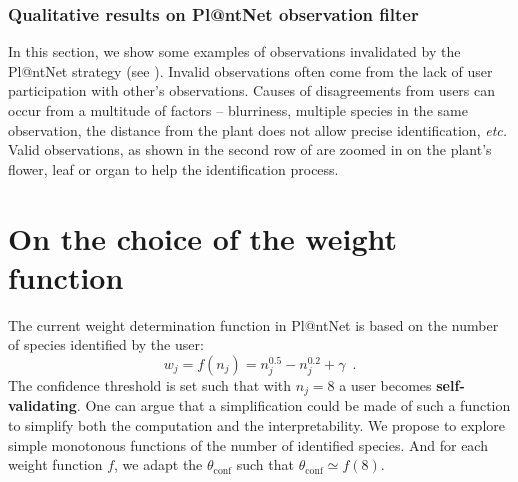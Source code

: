 \subsubsection{Qualitative results on Pl@ntNet observation filter}

In this section, we show some examples of observations invalidated by the Pl@ntNet strategy (see ).
Invalid observations often come from the lack of user participation with other's observations.
Causes of disagreements from users can occur from a multitude of factors -- blurriness, multiple species in the same observation, the distance from the plant does not allow precise identification, \emph{etc.}
Valid observations, as shown in the second row of  are zoomed in on the plant's flower, leaf or organ to help the identification process.

\section{On the choice of the weight function}

The current weight determination function in Pl@ntNet is based on the number of species identified by the user:
\begin{equation}
    w_j = f(n_j) = n_j^{0.5} - n_j^{0.2} + \gamma \enspace.
\end{equation}
The confidence threshold is set such that with $n_j=8$ a user becomes \textbf{self-validating}.
One can argue that a simplification could be made of such a function to simplify both the computation and the interpretability.
We propose to explore simple monotonous functions of the number of identified species.
And for each weight function $f$, we adapt the $\theta_\mathrm{conf}$ such that $\theta_\mathrm{conf} \simeq f(8)$.

\begin{table}[htbp]
    \caption{Weight functions tested and the associated confidence threshold $\theta_\mathrm{conf}$.}
    \label{tab:weight_functions}
    \centering
\end{table}

